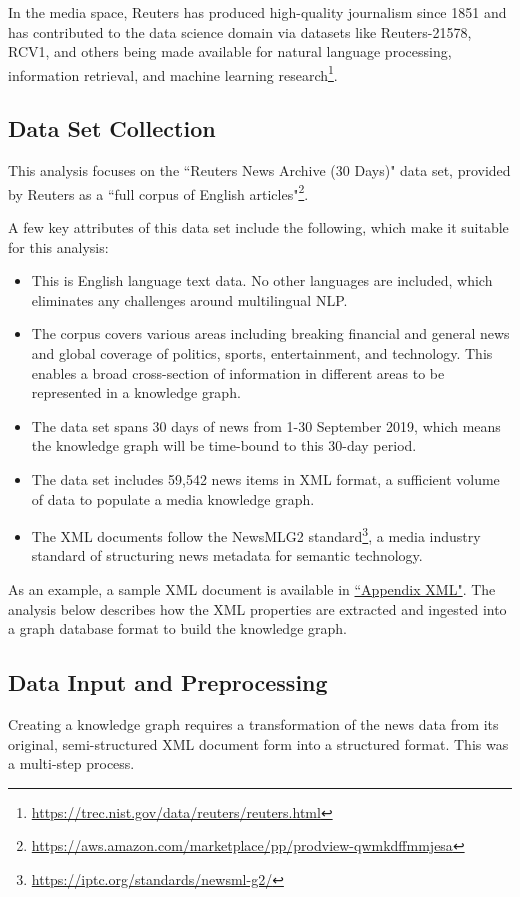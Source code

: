 \documentclass[11pt]{article}
\begin{document}
In the media space, Reuters has produced high-quality journalism since 1851 and has contributed to the data science domain via datasets like Reuters-21578\cite{reuters-21578}, RCV1\cite{lewis2004rcv1}, and others\cite{reuters-corpora} being made available for natural language processing, information retrieval, and machine learning research\footnote{\url{https://trec.nist.gov/data/reuters/reuters.html}}.

\subsection{Data Set Collection}
This analysis focuses on the ``Reuters News Archive (30 Days)" data set, provided by Reuters as a ``full corpus of English articles"\footnote{\url{https://aws.amazon.com/marketplace/pp/prodview-qwmkdffmmjesa}}.

A few key attributes of this data set include the following, which make it suitable for this analysis:
\begin{itemize}
  \item{This is English language text data. No other languages are included, which eliminates any challenges around multilingual NLP.}
  \item{The corpus covers various areas including breaking financial and general news and global coverage of politics, sports, entertainment, and technology. This enables a broad cross-section of information in different areas to be represented in a knowledge graph.}
  \item{The data set spans 30 days of news from 1-30 September 2019, which means the knowledge graph will be time-bound to this 30-day period.}
  \item{The data set includes 59,542 news items in XML format, a sufficient volume of data to populate a media knowledge graph.}
  \item{The XML documents follow the NewsMLG2 standard\footnote{\url{https://iptc.org/standards/newsml-g2/}}, a media industry standard of structuring news metadata for semantic technology.}
\end{itemize}

As an example, a sample XML document is available in \hyperref[sec:AppendixXML]{``Appendix XML"}. The analysis below describes how the XML properties are extracted and ingested into a graph database format to build the knowledge graph.

\subsection{Data Input and Preprocessing}
Creating a knowledge graph requires a transformation of the news data from its original, semi-structured XML document form into a structured format. This was a multi-step process.
\end{document}
